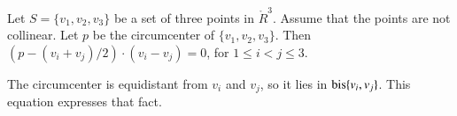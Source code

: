 \begin{tarskidata}
\begin{tarski}
\begin{lemma}
Let $S=\{v_1,v_2,v_3\}$ be a set of three points
in $\ring{R}^3$.  Assume that the points are not collinear.
Let $p$ be the circumcenter of $\{v_1,v_2,v_3\}$.   Then
  $(p-(v_i+v_j)/2)\cdot (v_i-v_j)=0$, for $1\le i<j\le 3$.
\end{lemma}

\begin{proved}  The circumcenter is equidistant from $v_i$
and $v_j$, so it lies in ${\operatorname{bis}}\{v_i,v_j\}$.
This equation expresses that fact.
\swallowed\end{proved}
\end{tarski}














%
%





\end{tarskidata}
